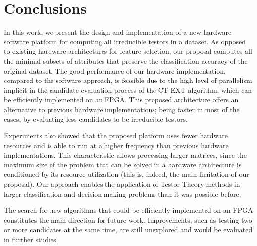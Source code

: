 \documentclass[authoryear,preprint,review,12pt]{elsarticle}
\begin{document}
\section{Conclusions}
\label{sect:8}
In this work, we present the design and implementation of a new hardware software platform for
computing all irreducible testors in a dataset.  As opposed to existing hardware 
architectures for feature selection, our proposal computes all the
minimal subsets of attributes that preserve the classification accuracy of the original dataset.
The good performance of our hardware implementation, compared to the software approach, is 
feasible due to the high level of parallelism implicit in the candidate evaluation process of 
the CT-EXT algorithm; which can be efficiently implemented on an FPGA. 
This proposed architecture offers an alternative to previous hardware implementations; being 
faster in most of the cases, by evaluating less candidates to be irreducible testors. 

Experiments also showed that the proposed platform uses fewer hardware resources and is able to 
run at a higher frequency than previous hardware implementations. This characteristic allows 
processing larger matrices, since the maximum size of the problem that can be solved in a hardware 
architecture is conditioned by its resource utilization (this is, indeed, the main limitation of
our proposal). 
Our approach enables the application of Testor Theory methods in larger classification and 
decision-making problems than it was possible before. 

The search for new algorithms that could be efficiently implemented on an FPGA constitutes the main
direction for future work. Improvements, such as testing two or more candidates at the same time, are 
still unexplored and would be evaluated in further studies.




\end{document}
